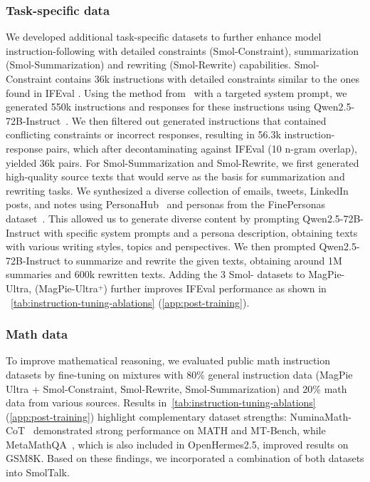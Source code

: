 \documentclass{article}
\theoremstyle{plain}
\theoremstyle{definition}
\theoremstyle{remark}
\begin{document}
\subsubsection{Task-specific data}
We developed additional task-specific datasets to further enhance model instruction-following with detailed constraints (Smol-Constraint), summarization (Smol-Summarization) and rewriting (Smol-Rewrite) capabilities.
Smol-Constraint contains 36k instructions with detailed constraints similar to the ones found in IFEval \cite{zhou2023instruction}. Using the method from~\cite{xu2024magpie} with a targeted system prompt, we generated 550k instructions and responses for these instructions using Qwen2.5-72B-Instruct~\cite{Yang2024Qwen2TR}. We then filtered out generated instructions that contained conflicting constraints or incorrect responses, resulting in 56.3k instruction-response pairs, which after decontaminating against IFEval (10 n-gram overlap), yielded 36k pairs.
For Smol-Summarization and Smol-Rewrite, we first generated high-quality source texts that would serve as the basis for summarization and rewriting tasks. We synthesized a diverse collection of emails, tweets, LinkedIn posts, and notes using PersonaHub~\cite{ge2024scaling} and personas from the FinePersonas dataset~\cite{finepersonas2024,chan2024scalingsyntheticdatacreation}. This allowed us to generate diverse content by prompting Qwen2.5-72B-Instruct with specific system prompts and a persona description, obtaining texts with various writing styles, topics and perspectives. We then prompted Qwen2.5-72B-Instruct to summarize and rewrite the given texts, obtaining around 1M summaries and 600k rewritten texts.
Adding the 3 Smol- datasets to MagPie-Ultra, (MagPie-Ultra$\overset{+}{}$) further improves IFEval performance as shown in ~\cref{tab:instruction-tuning-ablations} (\cref{app:post-training}). 

\vspace{-0.1cm} 
\subsubsection{Math data}
\vspace{-0.15cm} 
To improve mathematical reasoning, we evaluated public math instruction datasets by fine-tuning on mixtures with 80\% general instruction data (MagPie Ultra + Smol-Constraint, Smol-Rewrite, Smol-Summarization) and 20\% math data from various sources. Results in~\cref{tab:instruction-tuning-ablations} (\cref{app:post-training}) highlight complementary dataset strengths: NuminaMath-CoT~\cite{numina_math_datasets} demonstrated strong performance on MATH and MT-Bench, while MetaMathQA~\cite{yu2023metamath}, which is also included in OpenHermes2.5, improved results on GSM8K. Based on these findings, we incorporated a combination of both datasets into SmolTalk.
\vspace{-0.1cm} 
\end{document}
